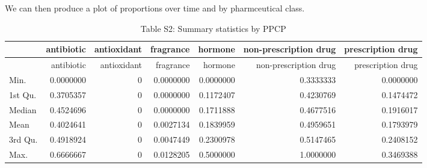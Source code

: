 \documentclass[
]{article}
\begin{document}
We can then produce a plot of proportions over time and by pharmceutical
class.

\captionsetup[table]{labelformat=empty}

\begin{longtable}[]{@{}lrrrrrr@{}}
\caption{Table S2: Summary statistics by PPCP}\tabularnewline
\toprule
& antibiotic & antioxidant & fragrance & hormone & non-prescription drug
& prescription drug\tabularnewline
\midrule
\endfirsthead
\toprule
& antibiotic & antioxidant & fragrance & hormone & non-prescription drug
& prescription drug\tabularnewline
\midrule
\endhead
Min. & 0.0000000 & 0 & 0.0000000 & 0.0000000 & 0.3333333 &
0.0000000\tabularnewline
1st Qu. & 0.3705357 & 0 & 0.0000000 & 0.1172407 & 0.4230769 &
0.1474472\tabularnewline
Median & 0.4524696 & 0 & 0.0000000 & 0.1711888 & 0.4677516 &
0.1916017\tabularnewline
Mean & 0.4024641 & 0 & 0.0027134 & 0.1839959 & 0.4959651 &
0.1793979\tabularnewline
3rd Qu. & 0.4918924 & 0 & 0.0047449 & 0.2300978 & 0.5147465 &
0.2408152\tabularnewline
Max. & 0.6666667 & 0 & 0.0128205 & 0.5000000 & 1.0000000 &
0.3469388\tabularnewline
\bottomrule
\end{longtable}
\end{document}
